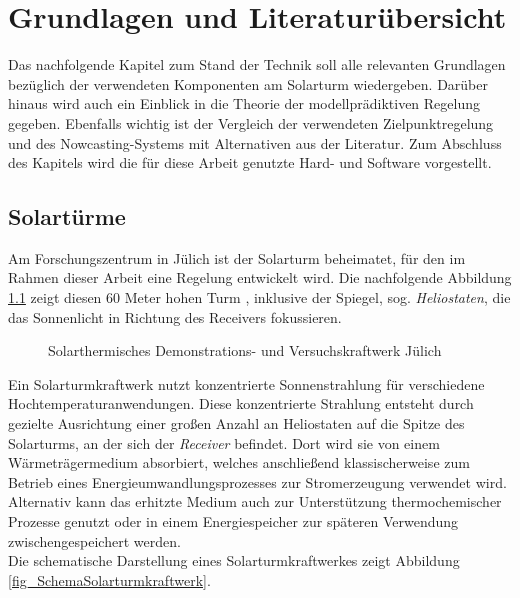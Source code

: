 \chapter{Grundlagen und Literaturübersicht} \label{ch_StandTechnik}
Das nachfolgende Kapitel zum Stand der Technik soll alle relevanten Grundlagen bezüglich der verwendeten Komponenten am Solarturm wiedergeben.
Darüber hinaus wird auch ein Einblick in die Theorie der modellprädiktiven Regelung gegeben.
Ebenfalls wichtig ist der Vergleich der verwendeten Zielpunktregelung und des Nowcasting-Systems mit Alternativen aus der Literatur.
Zum Abschluss des Kapitels wird die für diese Arbeit genutzte Hard- und Software vorgestellt.

\section{Solartürme} \label{sec_Solartürme}
Am Forschungszentrum in Jülich ist der Solarturm beheimatet, für den im Rahmen dieser Arbeit eine Regelung entwickelt wird.
Die nachfolgende Abbildung \ref{fig_Solarturm} zeigt diesen 60 Meter hohen Turm \cite{DLRSolartürmeBild}, inklusive der Spiegel, sog. \textit{Heliostaten}, die das Sonnenlicht in Richtung des Receivers fokussieren.

\begin{figure}[h!]
    \centering
    \setlength{\fboxsep}{1pt}
    \setlength{\fboxrule}{1pt}
\caption[Solarthermisches Demonstrations- und Versuchskraftwerk Jülich]{Solarthermisches Demonstrations- und Versuchskraftwerk Jülich \cite{DLRSolartürmeBild}}
    \label{fig_Solarturm}
\end{figure}

Ein Solarturmkraftwerk nutzt konzentrierte Sonnenstrahlung für verschiedene Hochtemperaturanwendungen.
Diese konzentrierte Strahlung entsteht durch gezielte Ausrichtung einer großen Anzahl an Heliostaten auf die Spitze des Solarturms, an der sich der \textit{Receiver} befindet.
Dort wird sie von einem Wärmeträgermedium absorbiert, welches anschließend klassischerweise zum Betrieb eines Energieumwandlungsprozesses zur Stromerzeugung verwendet wird.
Alternativ kann das erhitzte Medium auch zur Unterstützung thermochemischer Prozesse genutzt oder in einem Energiespeicher zur späteren Verwendung zwischengespeichert werden. \cite[S.11]{DissBelhomme}\\
Die schematische Darstellung eines Solarturmkraftwerkes zeigt Abbildung \ref{fig_SchemaSolarturmkraftwerk}.


